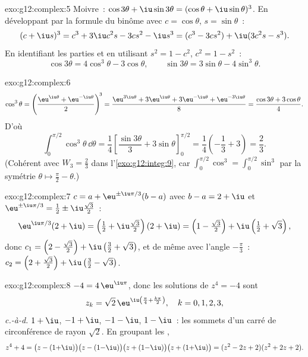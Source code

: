 \begin{solution}{exo:g12:complex:5}
Moivre~: $\cos3\theta + \iu\sin3\theta = (\cos\theta + \iu\sin\theta)^3$.
En développant par la formule du binôme avec $c = \cos\theta$,
$s = \sin\theta$~:
\[
(c + \iu s)^3 = c^3 + 3\iu c^2 s - 3 c s^2 - \iu s^3
= (c^3 - 3cs^2) + \iu(3c^2 s - s^3).
\]
En identifiant les parties et en utilisant $s^2 = 1 - c^2$,
$c^2 = 1 - s^2$~:
\[
\cos3\theta = 4\cos^3\theta - 3\cos\theta,
\qquad
\sin3\theta = 3\sin\theta - 4\sin^3\theta .
\]
\end{solution}

\begin{solution}{exo:g12:complex:6}
\[
\cos^3\theta = \left(\frac{\eu^{\iu\theta} + \eu^{-\iu\theta}}{2}\right)^{\!3}
= \frac{\eu^{3\iu\theta} + 3\eu^{\iu\theta} + 3\eu^{-\iu\theta} + \eu^{-3\iu\theta}}{8}
= \frac{\cos3\theta + 3\cos\theta}{4}.
\]
D'où
\[
\int_0^{\pi/2}\cos^3\theta\,\dd\theta
= \frac14\left[\frac{\sin3\theta}{3} + 3\sin\theta\right]_0^{\pi/2}
= \frac14\left(-\frac13 + 3\right) = \frac{2}{3}.
\]
(Cohérent avec $W_3 = \frac23$ dans l'\cref{exo:g12:integ:9}, car
$\int_0^{\pi/2}\cos^3 = \int_0^{\pi/2}\sin^3$ par la symétrie
$\theta \mapsto \frac\pi2 - \theta$.)
\end{solution}

\begin{solution}{exo:g12:complex:7}
$c = a + \eu^{\pm\iu\pi/3}(b - a)$ avec $b - a = 2 + \iu$ et
$\eu^{\pm\iu\pi/3} = \frac12 \pm \iu\frac{\sqrt3}{2}$~:
\[
\eu^{\iu\pi/3}(2+\iu) = \left(\tfrac12 + \iu\tfrac{\sqrt3}{2}\right)(2+\iu)
= \left(1 - \tfrac{\sqrt3}{2}\right) + \iu\left(\tfrac12 + \sqrt3\right),
\]
donc $c_1 = \left(2 - \frac{\sqrt3}{2}\right) +
\iu\left(\frac32 + \sqrt3\right)$, et de même avec l'angle
$-\frac\pi3$~:
$c_2 = \left(2 + \frac{\sqrt3}{2}\right) + \iu\left(\frac32 - \sqrt3\right)$.
\end{solution}

\begin{solution}{exo:g12:complex:8}
$-4 = 4\,\eu^{\iu\pi}$, donc les solutions de $z^4 = -4$ sont
\[
z_k = \sqrt2\,\eu^{\iu\left(\frac\pi4 + \frac{k\pi}{2}\right)},
\quad k = 0, 1, 2, 3,
\]
\emph{c.-à-d.} $1 + \iu$, $-1 + \iu$, $-1 - \iu$, $1 - \iu$~: les sommets
d'un carré de circonférence de rayon $\sqrt 2$. En groupant les 
,
\[
z^4 + 4 = \bigl(z - (1{+}\iu)\bigr)\bigl(z - (1{-}\iu)\bigr)
\bigl(z + (1{-}\iu)\bigr)\bigl(z + (1{+}\iu)\bigr)
= (z^2 - 2z + 2)(z^2 + 2z + 2).
\]
\end{solution}

